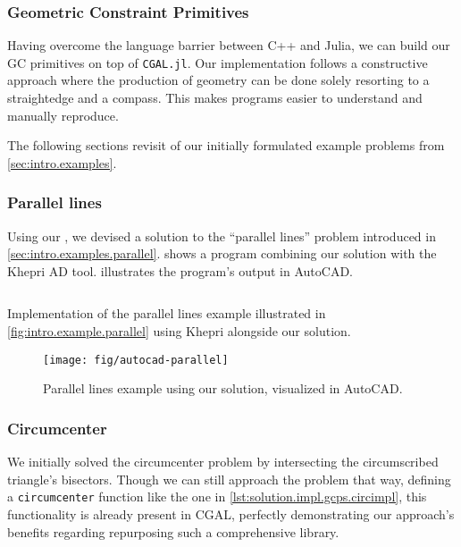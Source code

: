\subsubsection{Geometric Constraint Primitives}%
\label{sec:solution.impl.gcps}

Having overcome the language barrier between C++ and Julia, we can build our
\ac{GC} primitives on top of \texttt{CGAL.jl}.  Our implementation follows a
constructive approach where the production of geometry can be done solely
resorting to a straightedge and a compass.  This makes programs easier to
understand and manually reproduce.

The following sections revisit of our initially formulated example problems from
\cref{sec:intro.examples}.

\subsubsection*{Parallel lines}%
\label{sec:solution.impl.gcps.parallel}

Using our \primitives{}, we devised a solution to the ``parallel lines'' problem
introduced in \cref{sec:intro.examples.parallel}.
 shows a program combining our solution
with the Khepri \ac{AD} tool.  illustrates
the program's output in AutoCAD.

\begin{listing}[htbp]
  \inputminted{julia}{jl/ex_parallel.jl}
  \caption{\label{lst:solution.impl.gcps.parallel}
    Implementation of the parallel lines example illustrated in
    \cref{fig:intro.example.parallel} using Khepri alongside our solution.}
\end{listing}

\begin{figure}[htbp]
  \texttt{[image: fig/autocad-parallel]} 
  \caption{\label{fig:solution.impl.gcps.parallel}
    Parallel lines example using our solution, visualized in AutoCAD\@.}
\end{figure}

\subsubsection*{Circumcenter}%
\label{sec:solution.impl.gcps.circumcenter}

We initially solved the circumcenter problem by intersecting the circumscribed
triangle's bisectors.  Though we can still approach the problem that way,
defining a \texttt{circumcenter} function like the one in
\cref{lst:solution.impl.gcps.circimpl}, this functionality is already present in
\ac{CGAL},  perfectly demonstrating our approach's benefits regarding
repurposing such a comprehensive library.

